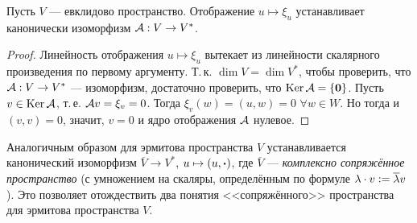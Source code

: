 \begin{theorem}
    Пусть $V$ --- евклидово пространство. Отображение $u \mapsto \xi_u$ устанавливает канонически изоморфизм $\mathcal{A}: V \to V^\ast$.
\end{theorem}

\begin{proof}
    Линейность отображения $u \mapsto \xi_u$ вытекает из линейности скалярного произведения по первому аргументу. Т.\,к. $\dim V = \dim V^\ast$, чтобы проверить, что $\mathcal{A}: V \to V^\ast$ --- изоморфизм, достаточно проверить, что $\operatorname{Ker}\mathcal{A} = \{\boldsymbol{0}\}$. Пусть $v \in \operatorname{Ker}\mathcal{A}$, т.\,е. $\mathcal{A} v = \xi_v = 0$. Тогда $\xi_v(w) = (u, w) = 0$ $\forall w \in W$. Но тогда и $(v, v) = 0$, значит, $v = 0$ и ядро отображения $\mathcal{A}$ нулевое.
\end{proof}

Аналогичным образом для эрмитова пространства $V$ устанавливается канонический изоморфизм $\overline{V} \to V^\ast$, $u \mapsto (u, \boldsymbol{\cdot})$, где $\overline{V}$ --- \textit{комплексно сопряжённое пространство} (с умножением на скаляры, определённым по формуле $\lambda \cdot v \vcentcolon = \overline{\lambda}v$). Это позволяет отождествить два понятия <<сопряжённого>> пространства для эрмитова пространства $V$.

